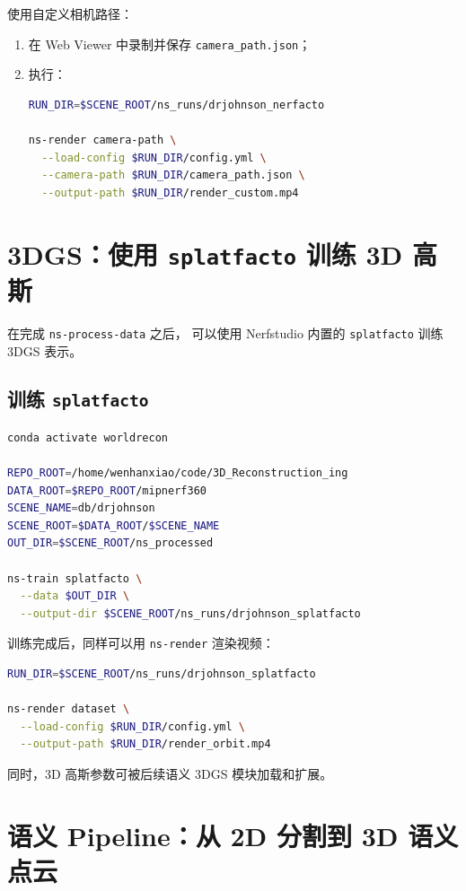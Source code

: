 \documentclass[12pt]{ctexart}
\begin{document}
使用自定义相机路径：
\begin{enumerate}
  \item 在 Web Viewer 中录制并保存 \texttt{camera\_path.json}；
  \item 执行：
\begin{lstlisting}[language=bash]
RUN_DIR=$SCENE_ROOT/ns_runs/drjohnson_nerfacto

ns-render camera-path \
  --load-config $RUN_DIR/config.yml \
  --camera-path $RUN_DIR/camera_path.json \
  --output-path $RUN_DIR/render_custom.mp4
\end{lstlisting}
\end{enumerate}

\section{3DGS：使用 \texttt{splatfacto} 训练 3D 高斯}

在完成 \texttt{ns-process-data} 之后，
可以使用 Nerfstudio 内置的 \texttt{splatfacto} 训练 3DGS 表示。

\subsection{训练 \texttt{splatfacto}}

\begin{lstlisting}[language=bash]
conda activate worldrecon

REPO_ROOT=/home/wenhanxiao/code/3D_Reconstruction_ing
DATA_ROOT=$REPO_ROOT/mipnerf360
SCENE_NAME=db/drjohnson
SCENE_ROOT=$DATA_ROOT/$SCENE_NAME
OUT_DIR=$SCENE_ROOT/ns_processed

ns-train splatfacto \
  --data $OUT_DIR \
  --output-dir $SCENE_ROOT/ns_runs/drjohnson_splatfacto
\end{lstlisting}

训练完成后，同样可以用 \texttt{ns-render} 渲染视频：
\begin{lstlisting}[language=bash]
RUN_DIR=$SCENE_ROOT/ns_runs/drjohnson_splatfacto

ns-render dataset \
  --load-config $RUN_DIR/config.yml \
  --output-path $RUN_DIR/render_orbit.mp4
\end{lstlisting}

同时，3D 高斯参数可被后续语义 3DGS 模块加载和扩展。

\section{语义 Pipeline：从 2D 分割到 3D 语义点云}
\end{document}
